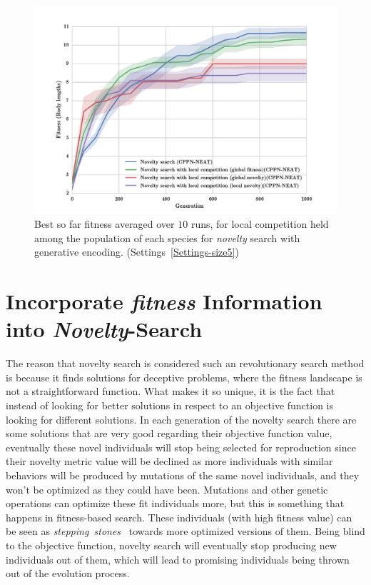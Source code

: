 \begin{figure}[t!]
\centering
\includegraphics[width=1.0\textwidth]{../Figures/Results/NoveltyCompetitionsSize5.pdf}
\caption{Best so far fitness averaged over $10$ runs, for local competition held among the population of each species for \emph{novelty} search with generative encoding. (Settings~\ref{Settings-size5})}
\label{fig:NoveltyCompetitionsSize5}
\end{figure}



\section{Incorporate \emph{fitness} Information into \emph{Novelty}-Search}

The reason that novelty search is considered such an revolutionary search method is because it finds solutions for deceptive problems, where the fitness landscape is not a straightforward function. What makes it so unique, it is the fact that instead of looking for better solutions in respect to an objective function is looking for different solutions. In each generation of the novelty search there are some solutions that are very good regarding their objective function value, eventually these novel individuals will stop being selected for reproduction since their novelty metric value will be declined as more individuals with similar behaviors will be produced by mutations of the same novel individuals, and they won't be optimized as they could have been. Mutations and other genetic operations can optimize these fit individuals more, but this is something that happens in fitness-based search. These individuals (with high fitness value) can be seen as \emph{stepping~stones}~\citep{lehman2011abandoning} towards more optimized versions of them. Being blind to the objective function, novelty search will eventually stop producing new individuals out of them, which will lead to promising individuals being thrown out of the evolution process. 

